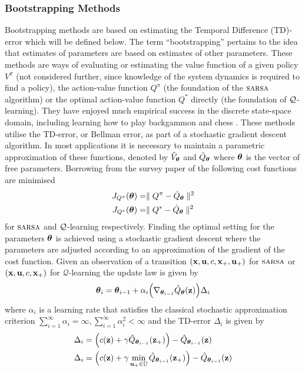 \subsubsection{Bootstrapping Methods}
Bootstrapping methods are based on estimating the Temporal Difference (TD)-error which will be defined below. The term ``bootstrapping'' pertains to the idea that estimates of parameters are based on estimates of other parameters. These methods are ways of evaluating or estimating the value function of a given policy $V^\pi$ (not considered further, since knowledge of the system dynamics is required to find a policy), the action-value function $Q^\pi$ (the foundation of the $\textsc{sarsa}$ algorithm) or the optimal action-value function $Q^*$ directly (the foundation of $\mathcal{Q}$-learning). They have enjoyed much empirical success in the discrete state-space domain, including learning how to play backgammon \cite{Tes92,Tes95} and chess \cite{BTW00}. These methods utilise the TD-error, or Bellman error, as part of a stochastic gradient descent algorithm. In most applications it is necessary to maintain a parametric approximation of these functions, denoted by $\hat V_{\boldsymbol{\theta}}$ and $\hat Q_{\boldsymbol{\theta}}$ where $\boldsymbol{\theta}$ is the vector of free parameters. Borrowing from the survey paper of \cite{GP10b} the following cost functions are minimised
\begin{align}
J_{Q^{\pi}}(\boldsymbol{\theta}) &= \parallel Q^\pi - \hat Q_{\boldsymbol{\theta}} \parallel^2 \label{eqn:JQcost1} \\
J_{Q^*}(\boldsymbol{\theta}) &= \parallel Q^* - \hat Q_{\boldsymbol{\theta}} \parallel^2 \label{eqn:JQcost2}
\end{align}
for $\textsc{sarsa}$ and $\mathcal{Q}$-learning respectively. Finding the optimal setting for the parameters $\boldsymbol{\theta}$ is achieved using a stochastic gradient descent where the parameters are adjusted according to an approximation of the gradient of the cost function. Given an observation of a transition $(\mathbf{x},\mathbf{u},c,\mathbf{x}_+,\mathbf{u}_+)$ for $\textsc{sarsa}$ or $(\mathbf{x},\mathbf{u},c,\mathbf{x}_+)$ for $\mathcal{Q}$-learning the update law is given by
\begin{equation*}
\boldsymbol{\theta}_i = \boldsymbol{\theta}_{i-1} + \alpha_i \Big( \nabla_{\boldsymbol{\theta}_{i-1}}\hat Q_{\boldsymbol{\theta}}(\mathbf{z}) \Big) \Delta_{i}
\end{equation*}
where $\alpha_i$ is a learning rate that satisfies the classical stochastic approximation criterion $\sum^\infty_{i=1} \alpha_i = \infty, \sum^\infty_{i=1} \alpha_i^2 < \infty$ and the TD-error $\Delta_{i}$ is given by
\begin{align*}
\Delta_{i} &=  \Big(c(\mathbf{z}) + \gamma \hat Q_{\boldsymbol{\theta}_{i-1}}(\mathbf{z}_+) \Big) - \hat Q_{\boldsymbol{\theta}_{i-1}}(\mathbf{z}) \\
\Delta_{i} &=  \Big(c(\mathbf{z}) + \gamma \min_{\mathbf{u}_+ \in \mathbb{U}}\hat Q_{\boldsymbol{\theta}_{i-1}}(\mathbf{z}_+) \Big) - \hat Q_{\boldsymbol{\theta}_{i-1}}(\mathbf{z})
\end{align*}
